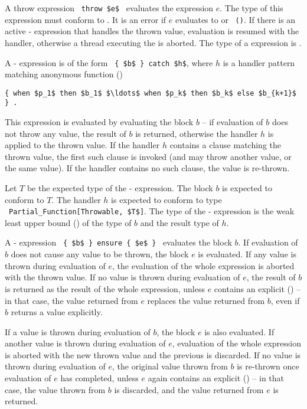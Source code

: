 A throw expression ~\lstinline!throw $e$!~ evaluates the expression $e$. The type of this expression must conform to . It is an error if $e$ evaluates to  or ~\lstinline!()!. If there is an active - expression that handles the thrown value, evaluation is resumed with the handler, otherwise a thread executing the  is aborted. The type of a  expression is . 

A - expression is of the form ~\lstinline!{ $b$ } catch $h$!, where $h$ is a handler pattern matching anonymous function ()
\begin{lstlisting}
{ when $p_1$ then $b_1$ $\ldots$ when $p_k$ then $b_k$ else $b_{k+1}$ } .
\end{lstlisting}

This expression is evaluated by evaluating the block $b$ -- if evaluation of $b$ does not throw any value, the result of $b$ is returned, otherwise the handler $h$ is applied to the thrown value. If the handler $h$ contains a  clause matching the thrown value, the first such clause is invoked (and may throw another value, or the same value). If the handler contains no such clause, the value is re-thrown. 

Let $T$ be the expected type of the - expression. The block $b$ is expected to conform to $T$. The handler $h$ is expected to conform to type ~\lstinline!Partial_Function[Throwable, $T$]!. The type of the - expression is the weak least upper bound () of the type of $b$ and the result type of $h$. 

A - expression ~\lstinline!{ $b$ } ensure { $e$ }!~ evaluates the block $b$. If evaluation of $b$ does not cause any value to be thrown, the block $e$ is evaluated. If any value is thrown during evaluation of $e$, the evaluation of the whole expression is aborted with the thrown value. If no value is thrown during evaluation of $e$, the result of $b$ is returned as the result of the whole expression, unless $e$ contains an explicit  () -- in that case, the value returned from $e$ replaces the value returned from $b$, even if $b$ returns a value explicitly. 

If a value is thrown during evaluation of $b$, the  block $e$ is also evaluated. If another value is thrown during evaluation of $e$, evaluation of the whole expression is aborted with the new thrown value and the previous is discarded. If no value is thrown during evaluation of $e$, the original value thrown from $b$ is re-thrown once evaluation of $e$ has completed, unless $e$ again contains an explicit  () -- in that case, the value thrown from $b$ is discarded, and the value returned from $e$ is returned. 


